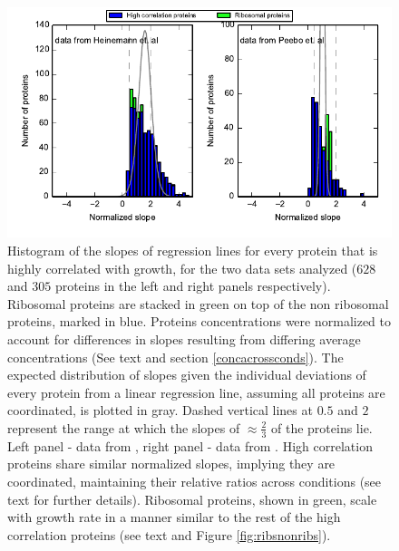 \documentclass[a4paper]{article}
\newcommand{\hGlobal}{$628$}
\newcommand{\vnGlobal}{$305$}
\newcommand{\vGlobal}{\vnGlobal{}}
\begin{document}
\begin{figure}[H]
\begin{center}
\includegraphics[width=1\columnwidth]{AllProtsVSRibosomalNormalizedSlopes.pdf}
\caption{\label{fig:globalfit}
    Histogram of the slopes of regression lines for every protein that is highly correlated with growth, for the two data sets analyzed (\hGlobal{} and \vGlobal{} proteins in the left and right panels respectively).
    Ribosomal proteins are stacked in green on top of the non ribosomal proteins, marked in blue.
    Proteins concentrations were normalized to account for differences in slopes resulting from differing average concentrations (See text and section \ref{concacrossconds}).
    The expected distribution of slopes given the individual deviations of every protein from a linear regression line, assuming all proteins are coordinated, is plotted in gray.
    Dashed vertical lines at $0.5$ and $2$ represent the range at which the slopes of $\approx \frac{2}{3}$ of the proteins lie.
    Left panel - data from \cite{Heinemann2015}, right panel - data from \cite{Peebo_2015}.
    High correlation proteins share similar normalized slopes, implying they are coordinated, maintaining their relative ratios across conditions (see text for further details).
    Ribosomal proteins, shown in green, scale with growth rate in a manner similar to the rest of the high correlation proteins (see text and Figure \ref{fig:ribsnonribs}).
}
\end{center}
\end{figure}
\end{document}
